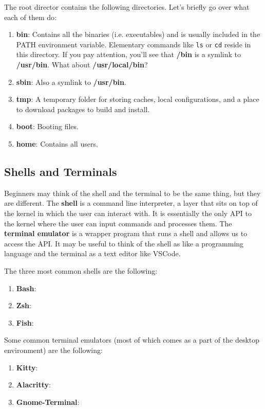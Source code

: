 \documentclass{article}
\begin{document}
    The root director contains the following directories. Let's briefly go over what each of them do: 
    \begin{enumerate}
      \item \textbf{bin}: Contains all the binaries (i.e. executables) and is usually included in the PATH environment variable. Elementary commands like \texttt{ls} or \texttt{cd} reside in this directory. If you pay attention, you'll see that \textbf{/bin} is a symlink to \textbf{/usr/bin}. What about \textbf{/usr/local/bin}? 
      \item \textbf{sbin}: Also a symlink to \textbf{/usr/bin}.   
      \item \textbf{tmp}: A temporary folder for storing caches, local configurations, and a place to download packages to build and install. 
      \item \textbf{boot}: Booting files. 
      \item \textbf{home}: Contains all users. 
    \end{enumerate}
  
  \subsection{Shells and Terminals}

    Beginners may think of the shell and the terminal to be the same thing, but they are different. The \textbf{shell} is a command line interpreter, a layer that sits on top of the kernel in which the user can interact with. It is essentially the only API to the kernel where the user can input commands and processes them. The \textbf{terminal emulator} is a wrapper program that runs a shell and allows us to access the API. It may be useful to think of the shell as like a programming language and the terminal as a text editor like VSCode. 

    The three most common shells are the following: 
    \begin{enumerate}
      \item \textbf{Bash}: 
      \item \textbf{Zsh}: 
      \item \textbf{Fish}:  
    \end{enumerate}

    Some common terminal emulators (most of which comes as a part of the desktop environment) are the following: 
    \begin{enumerate}
      \item \textbf{Kitty}: 
      \item \textbf{Alacritty}: 
      \item \textbf{Gnome-Terminal}: 
    \end{enumerate}
\end{document}
